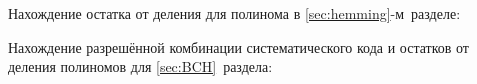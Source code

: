 \newpage
{} 

Нахождение остатка от деления для полинома в
\ref{sec:hemming}-м~разделе:  



Нахождение разрешённой комбинации систематического кода и остатков от
деления полиномов для \ref{sec:BCH}~раздела:

 \newpage


